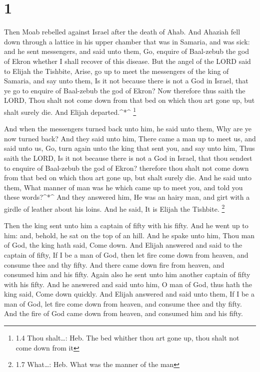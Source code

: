 \hypertarget{section}{%
\section{1}\label{section}}

 Then Moab rebelled against Israel after the death of Ahab.
 And Ahaziah fell down through a lattice in his upper
chamber that was in Samaria, and was sick: and he sent messengers, and
said unto them, Go, enquire of Baal-zebub the god of Ekron whether I
shall recover of this disease.  But the angel of the LORD
said to Elijah the Tishbite, Arise, go up to meet the messengers of the
king of Samaria, and say unto them, Is it not because there is not a God
in Israel, that ye go to enquire of Baal-zebub the god of Ekron?
 Now therefore thus saith the LORD, Thou shalt not come down
from that bed on which thou art gone up, but shalt surely die. And
Elijah departed.\^{}*\^{} \footnote{1.4 Thou shalt\ldots: Heb. The bed
  whither thou art gone up, thou shalt not come down from it}

 And when the messengers turned back unto him, he said unto
them, Why are ye now turned back?  And they said unto him,
There came a man up to meet us, and said unto us, Go, turn again unto
the king that sent you, and say unto him, Thus saith the LORD, Is it not
because there is not a God in Israel, that thou sendest to enquire of
Baal-zebub the god of Ekron? therefore thou shalt not come down from
that bed on which thou art gone up, but shalt surely die. 
And he said unto them, What manner of man was he which came up to meet
you, and told you these words?\^{}*\^{}  And they answered
him, He was an hairy man, and girt with a girdle of leather about his
loins. And he said, It is Elijah the Tishbite. \footnote{1.7 What\ldots:
  Heb. What was the manner of the man}

 Then the king sent unto him a captain of fifty with his
fifty. And he went up to him: and, behold, he sat on the top of an hill.
And he spake unto him, Thou man of God, the king hath said, Come down.
 And Elijah answered and said to the captain of fifty, If I
be a man of God, then let fire come down from heaven, and consume thee
and thy fifty. And there came down fire from heaven, and consumed him
and his fifty.  Again also he sent unto him another captain
of fifty with his fifty. And he answered and said unto him, O man of
God, thus hath the king said, Come down quickly.  And
Elijah answered and said unto them, If I be a man of God, let fire come
down from heaven, and consume thee and thy fifty. And the fire of God
came down from heaven, and consumed him and his fifty.

